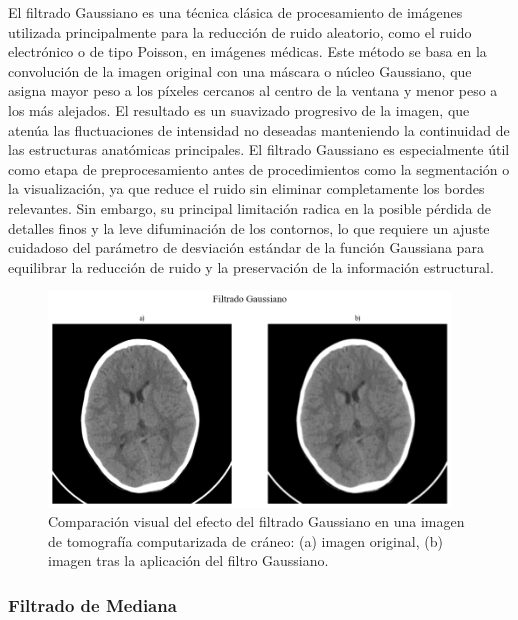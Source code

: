 El filtrado Gaussiano\cite{GaussianFilter} es una técnica clásica de procesamiento de imágenes utilizada principalmente para la reducción de ruido aleatorio, como el ruido electrónico o de tipo Poisson, en imágenes médicas. Este método se basa en la convolución de la imagen original con una máscara o núcleo Gaussiano, que asigna mayor peso a los píxeles cercanos al centro de la ventana y menor peso a los más alejados. El resultado es un suavizado progresivo de la imagen, que atenúa las fluctuaciones de intensidad no deseadas manteniendo la continuidad de las estructuras anatómicas principales. El filtrado Gaussiano es especialmente útil como etapa de preprocesamiento antes de procedimientos como la segmentación o la visualización, ya que reduce el ruido sin eliminar completamente los bordes relevantes. Sin embargo, su principal limitación radica en la posible pérdida de detalles finos y la leve difuminación de los contornos, lo que requiere un ajuste cuidadoso del parámetro de desviación estándar de la función Gaussiana para equilibrar la reducción de ruido y la preservación de la información estructural.

\begin{figure}[H]
    \centering
    \includegraphics[width=0.95\textwidth]{Graphics/gaussian-filter.png}
    \caption{Comparación visual del efecto del filtrado Gaussiano en una imagen de tomografía computarizada de cráneo: (a) imagen original, (b) imagen tras la aplicación del filtro Gaussiano.}
    \label{fig:filter-gaussian}
\end{figure}

\subsubsection{Filtrado de Mediana}


